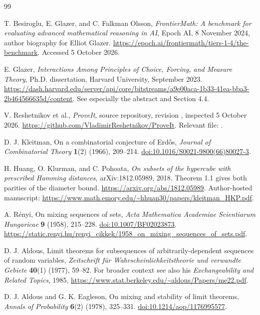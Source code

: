 \documentclass[11pt]{article}
\theoremstyle{definition}
\theoremstyle{remark}
\newcommand{\code}[1]{\texttt{\detokenize{#1}}}
\begin{document}
\begin{thebibliography}{99}
\raggedright

T. Besiroglu, E. Glazer, and C. Falkman Olsson,
\emph{FrontierMath: A benchmark for evaluating advanced mathematical reasoning
in AI}, Epoch AI, 8 November 2024, author biography for Elliot Glazer.
\url{https://epoch.ai/frontiermath/tiers-1-4/the-benchmark}.
Accessed 5 October 2026.

E. Glazer,
\emph{Interactions Among Principles of Choice, Forcing, and Measure Theory},
Ph.D. dissertation, Harvard University, September 2023.
\url{https://dash.harvard.edu/server/api/core/bitstreams/a9e00aca-1b33-41ea-bba3-2b464566635d/content}.
See especially the abstract and Section 4.4.

V. Reshetnikov et al., \emph{ProveIt}, source repository, revision
\code{3b9458b31f459b480ab43a068d7cc56f4cfdbb28}, inspected 5 October 2026.
\url{https://github.com/VladimirReshetnikov/ProveIt}.
Relevant file: .

D. J. Kleitman, On a combinatorial conjecture of Erd\H{o}s,
\emph{Journal of Combinatorial Theory} \textbf{1}(2) (1966), 209--214.
\href{https://doi.org/10.1016/S0021-9800(66)80027-3}{doi:10.1016/S0021-9800(66)80027-3}.

H. Huang, O. Klurman, and C. Pohoata,
\emph{On subsets of the hypercube with prescribed Hamming distances},
arXiv:1812.05989, 2018. Theorem 1.1 gives both parities of the diameter bound.
\url{https://arxiv.org/abs/1812.05989}.
Author-hosted manuscript:
\url{https://www.math.emory.edu/~hhuan30/papers/kleitman_HKP.pdf}.

A. R\'enyi, On mixing sequences of sets,
\emph{Acta Mathematica Academiae Scientiarum Hungaricae} \textbf{9} (1958),
215--228. \href{https://doi.org/10.1007/BF02023873}{doi:10.1007/BF02023873}.
\url{https://static.renyi.hu/renyi_cikkek/1958_on_mixing_sequences_of_sets.pdf}.

D. J. Aldous, Limit theorems for subsequences of arbitrarily-dependent
sequences of random variables,
\emph{Zeitschrift f\"ur Wahrscheinlichkeitstheorie und verwandte Gebiete}
\textbf{40}(1) (1977), 59--82.
For broader context see also his \emph{Exchangeability and Related Topics},
1985, \url{https://www.stat.berkeley.edu/~aldous/Papers/me22.pdf}.

D. J. Aldous and G. K. Eagleson, On mixing and stability of limit theorems,
\emph{Annals of Probability} \textbf{6}(2) (1978), 325--331.
\href{https://doi.org/10.1214/aop/1176995577}{doi:10.1214/aop/1176995577}.


\end{thebibliography}
\end{document}
